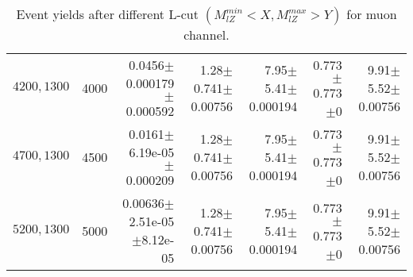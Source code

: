 \documentclass[]{article}
\begin{document}
\begin{table}
\begin{center}
{\begin{tabular}{ |r|r|r|r|r|r|r|}
$4200,1300$ & 4000 & 0.0456$\pm$0.000179$\pm$0.000592 & 1.28$\pm$0.741$\pm$0.00756 & 7.95$\pm$5.41$\pm$0.000194 & 0.773$\pm$0.773$\pm$0 & 9.91$\pm$5.52$\pm$0.00756 \\
$4700,1300$ & 4500 & 0.0161$\pm$6.19e-05$\pm$0.000209 & 1.28$\pm$0.741$\pm$0.00756 & 7.95$\pm$5.41$\pm$0.000194 & 0.773$\pm$0.773$\pm$0 & 9.91$\pm$5.52$\pm$0.00756 \\
$5200,1300$ & 5000 & 0.00636$\pm$2.51e-05$\pm$8.12e-05 & 1.28$\pm$0.741$\pm$0.00756 & 7.95$\pm$5.41$\pm$0.000194 & 0.773$\pm$0.773$\pm$0 & 9.91$\pm$5.52$\pm$0.00756 \\
\hline 
\end{tabular}
}
\end{center}
\caption{Event yields after different L-cut $(M_{lZ}^{min} < X, M_{lZ}^{max} > Y)$ for muon channel.}
\end{table}
\end{document}
